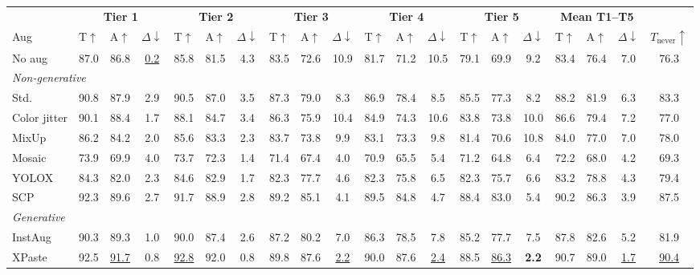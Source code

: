 \begin{tabular}{l ccc ccc ccc ccc ccc ccc c}
\toprule
& \multicolumn{3}{c}{\textbf{Tier 1}} & \multicolumn{3}{c}{\textbf{Tier 2}} & \multicolumn{3}{c}{\textbf{Tier 3}} & \multicolumn{3}{c}{\textbf{Tier 4}} & \multicolumn{3}{c}{\textbf{Tier 5}} & \multicolumn{3}{c}{\textbf{Mean T1--T5}} & \\
\cmidrule(lr){2-4} \cmidrule(lr){5-7} \cmidrule(lr){8-10} \cmidrule(lr){11-13} \cmidrule(lr){14-16} \cmidrule(lr){17-19}
Aug & T$\uparrow$ & A$\uparrow$ & $\Delta\downarrow$ & T$\uparrow$ & A$\uparrow$ & $\Delta\downarrow$ & T$\uparrow$ & A$\uparrow$ & $\Delta\downarrow$ & T$\uparrow$ & A$\uparrow$ & $\Delta\downarrow$ & T$\uparrow$ & A$\uparrow$ & $\Delta\downarrow$ & T$\uparrow$ & A$\uparrow$ & $\Delta\downarrow$ & $T_{\text{never}}\uparrow$ \\
\midrule
No aug & 87.0 & 86.8 & \underline{0.2} & 85.8 & 81.5 & 4.3 & 83.5 & 72.6 & 10.9 & 81.7 & 71.2 & 10.5 & 79.1 & 69.9 & 9.2 & 83.4 & 76.4 & 7.0 & 76.3 \\
\midrule
\multicolumn{20}{l}{\emph{Non-generative}} \\
Std. & 90.8 & 87.9 & 2.9 & 90.5 & 87.0 & 3.5 & 87.3 & 79.0 & 8.3 & 86.9 & 78.4 & 8.5 & 85.5 & 77.3 & 8.2 & 88.2 & 81.9 & 6.3 & 83.3 \\
Color jitter & 90.1 & 88.4 & 1.7 & 88.1 & 84.7 & 3.4 & 86.3 & 75.9 & 10.4 & 84.9 & 74.3 & 10.6 & 83.8 & 73.8 & 10.0 & 86.6 & 79.4 & 7.2 & 77.0 \\
MixUp & 86.2 & 84.2 & 2.0 & 85.6 & 83.3 & 2.3 & 83.7 & 73.8 & 9.9 & 83.1 & 73.3 & 9.8 & 81.4 & 70.6 & 10.8 & 84.0 & 77.0 & 7.0 & 78.0 \\
Mosaic & 73.9 & 69.9 & 4.0 & 73.7 & 72.3 & 1.4 & 71.4 & 67.4 & 4.0 & 70.9 & 65.5 & 5.4 & 71.2 & 64.8 & 6.4 & 72.2 & 68.0 & 4.2 & 69.3 \\
YOLOX & 84.3 & 82.0 & 2.3 & 84.6 & 82.9 & 1.7 & 82.3 & 77.7 & 4.6 & 82.3 & 75.8 & 6.5 & 82.3 & 75.7 & 6.6 & 83.2 & 78.8 & 4.3 & 79.4 \\
SCP & 92.3 & 89.6 & 2.7 & 91.7 & 88.9 & 2.8 & 89.2 & 85.1 & 4.1 & 89.5 & 84.8 & 4.7 & 88.4 & 83.0 & 5.4 & 90.2 & 86.3 & 3.9 & 87.5 \\
\midrule
\multicolumn{20}{l}{\emph{Generative}} \\
InstAug & 90.3 & 89.3 & 1.0 & 90.0 & 87.4 & 2.6 & 87.2 & 80.2 & 7.0 & 86.3 & 78.5 & 7.8 & 85.2 & 77.7 & 7.5 & 87.8 & 82.6 & 5.2 & 81.9 \\
XPaste & 92.5 & \underline{91.7} & 0.8 & \underline{92.8} & 92.0 & 0.8 & 89.8 & 87.6 & \underline{2.2} & 90.0 & 87.6 & \underline{2.4} & 88.5 & \underline{86.3} & \textbf{2.2} & 90.7 & 89.0 & \underline{1.7} & \underline{90.4} \\

\end{tabular}
